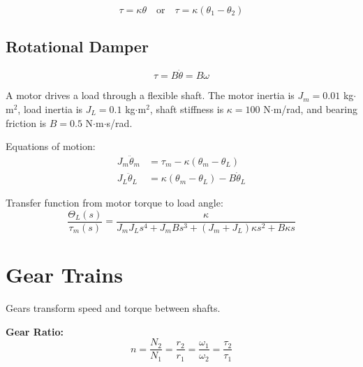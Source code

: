\begin{equation}
\tau = \kappa\theta \quad \text{or} \quad \tau = \kappa(\theta_1 - \theta_2)
\end{equation}

\subsection{Rotational Damper}

\begin{equation}
\tau = B\dot{\theta} = B\omega
\end{equation}

\begin{examplebox}[title=Example 1.4: Rotating Shaft System]
A motor drives a load through a flexible shaft. The motor inertia is $J_m = 0.01$ kg$\cdot$m$^2$, load inertia is $J_L = 0.1$ kg$\cdot$m$^2$, shaft stiffness is $\kappa = 100$ N$\cdot$m/rad, and bearing friction is $B = 0.5$ N$\cdot$m$\cdot$s/rad.



Equations of motion:
\begin{align}
J_m\ddot{\theta}_m &= \tau_m - \kappa(\theta_m - \theta_L) \\
J_L\ddot{\theta}_L &= \kappa(\theta_m - \theta_L) - B\dot{\theta}_L
\end{align}

Transfer function from motor torque to load angle:
\begin{equation}
\frac{\Theta_L(s)}{\tau_m(s)} = \frac{\kappa}{J_m J_L s^4 + J_m B s^3 + (J_m + J_L)\kappa s^2 + B\kappa s}
\end{equation}
\end{examplebox}

\section{Gear Trains}
\label{sec:gears}

Gears transform speed and torque between shafts.



\textbf{Gear Ratio:}
\begin{equation}
n = \frac{N_2}{N_1} = \frac{r_2}{r_1} = \frac{\omega_1}{\omega_2} = \frac{\tau_2}{\tau_1}
\end{equation}

